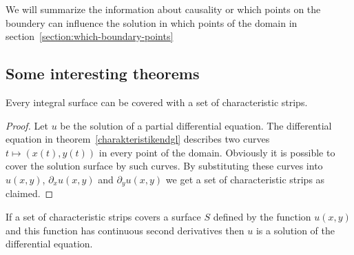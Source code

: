 We will summarize the information about causality or which points on
the boundery can influence the solution in which points of the domain
in section~\ref{section:which-boundary-points}

\subsection{Some interesting theorems}

\begin{satz}
Every integral surface can be covered with a set of characteristic
strips.
\end{satz}

\begin{proof}
Let $u$ be the solution of a partial differential equation.
The differential equation in theorem~\ref{charakteristikendgl}
describes two curves $t\mapsto(x(t),y(t))$ in every point of the domain.
Obviously it is possible to cover the solution surface by such curves.
By substituting these curves into $u(x,y)$, $\partial_xu(x,y)$
and $\partial_yu(x,y)$ we get a set of characteristic strips
as claimed.
\end{proof}

\begin{satz}
If a set of characteristic strips covers a surface $S$ defined
by the function $u(x,y)$ and this function has continuous 
second derivatives then $u$ is a solution of the differential equation.
\end{satz}

